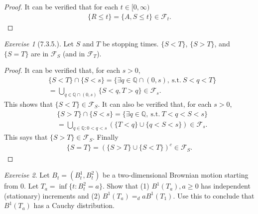\documentclass[12pt,a4paper]{amsart}
\theoremstyle{plain}
\theoremstyle{definition}
\theoremstyle{remark}
\newtheorem*{exe}{Exercise}
\numberwithin{equation}{section}
\begin{document}
\begin{proof}
It can be verified that for each $t\in [0,\infty)$
  \begin{align}
\{R \leq t\} = \{A, S \leq t\} \in \mathcal F_t.
  \end{align}
\end{proof}
\begin{exe}[7.3.5.]
Let $S$ and $T$ be stopping times. 
$\{S < T\}$, $\{S > T\}$, and $\{ S = T\}$ are in $\mathcal F_S$ (and in $\mathcal F_T$).
\end{exe}
\begin{proof}
It can be verified that, for each $s> 0$,
\begin{align}
&\{S < T\} \cap \{S < s\} = \{\exists q \in \mathbb Q \cap (0,s),~ \text{s.t.}~S < q < T \}
\\&= \bigcup_{q\in \mathbb Q \cap(0,s)} \{ S < q, T>q\} 
\in \mathcal F_s.
\end{align}
This shows that $\{S < T\}\in \mathcal F_S$.
It can also be verified that, for each $s>0$,
\begin{align}
&\{S > T\} \cap \{S < s\} 
= \{\exists q \in \mathbb Q,~ \text{s.t.}~T < q < S < s\}
\\&= \bigcup_{q\in \mathbb Q:0 < q < s}\left(\{ T < q \} \cup \{q<S<s\}\right) 
\in \mathcal F_s. 
\end{align}
This says that $\{S> T\}\in \mathcal F_S$. Finally
\begin{align}
  \{S = T\} = \left( \{S>T\} \cup \{S< T\} \right)^c \in \mathcal F_S.
\end{align}
\end{proof}
\begin{exe}
Let $B_t = (B_t^1, B_t^2)$ be a two-dimensional Brownian motion starting from $0$.
Let $T_a = \inf\{t: B_t^2 = a\}$.
Show that (1) $B^1(T_a), a\geq 0$ has independent (stationary) increments and (2) $B^1(T_a) = _d aB^1(T_1)$.
Use this to conclude that $B^1(T_a)$ has a Cauchy distribution. 
\end{exe}
\end{document}
